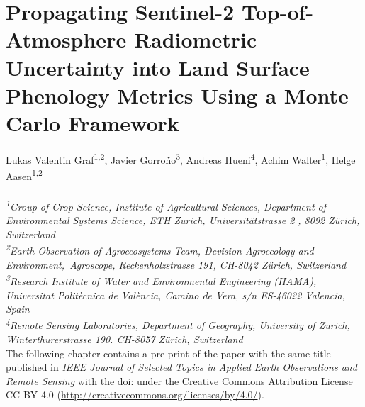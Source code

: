 \chapter{Propagating Sentinel-2 Top-of-Atmosphere Radiometric Uncertainty into Land Surface Phenology Metrics Using a Monte Carlo Framework}
\label{chap:uncertainty}
\graphicspath{{./04-Uncertainty/img}}

Lukas Valentin Graf\textsuperscript{1,2}, Javier Gorro\~{n}o\textsuperscript{3}, Andreas Hueni\textsuperscript{4}, Achim Walter\textsuperscript{1}, Helge Aasen\textsuperscript{1,2}
\\
\normalsize
\vspace{2pt}
\\
\textit{\textsuperscript{1}Group of Crop Science, Institute of Agricultural Sciences, Department of Environmental Systems Science, ETH Zurich, Universitätstrasse 2 , 8092 Zürich, Switzerland
\\
\textsuperscript{2}Earth Observation of Agroecosystems Team, Devision Agroecology and Environment,\ Agroscope, Reckenholzstrasse 191, CH-8042 Zürich, Switzerland
\\
\textsuperscript{3}Research Institute of Water and Environmental Engineering (IIAMA), Universitat Politècnica de València, Camino de Vera, s/n ES-46022 Valencia, Spain
\\
\textsuperscript{4}Remote Sensing Laboratories, Department of Geography, University of Zurich, Winterthurerstrasse 190. CH-8057 Zürich, Switzerland
\vspace{0.1cm}}
\\

The following chapter contains a pre-print of the paper with the same title published in \textsl{IEEE Journal of Selected Topics in Applied Earth Observations and Remote Sensing} with the doi:  under the Creative Commons Attribution License CC BY 4.0 (\url{http://creativecommons.org/licenses/by/4.0/}).


